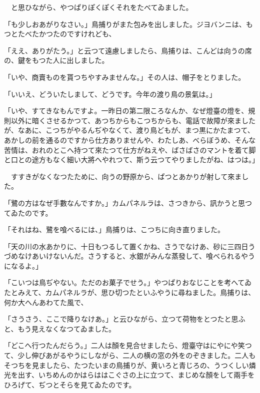 \documentclass[tate,paper=b6j,jafontsize=9pt]{jlreq}
\begin{document}
　と思ひながら、やつぱりぽくぽくそれをたべてゐました。

「も少しおあがりなさい。」鳥捕りがまた包みを出しました。ジヨバンニは、もつとたべたかつたのですけれども、

「ええ、ありがたう。」と云つて遠慮しましたら、鳥捕りは、こんどは向うの席の、鍵をもつた人に出しました。

「いや、商賣ものを貰つちやすみませんな。」その人は、帽子をとりました。

「いいえ、どういたしまして、どうです。今年の渡り鳥の景氣は。」

「いや、すてきなもんですよ。一昨日の第二限ころなんか、なぜ燈臺の燈を、規則以外に暗くさせるかつて、あつちからもこつちからも、電話で故障が來ましたが、なあに、こつちがやるんぢやなくて、渡り鳥どもが、まつ黒にかたまつて、あかしの前を通るのですから仕方ありませんや、わたしあ、べらぼうめ、そんな苦情は、おれのとこへ持つて來たつて仕方がねえや、ばさばさのマントを着て脚と口との途方もなく細い大將へやれつて、斯う云つてやりましたがね、はつは。」

　すすきがなくなつたために、向うの野原から、ぱつとあかりが射して來ました。

「鷺の方はなぜ手數なんですか。」カムパネルラは、さつきから、訊かうと思つてゐたのです。

「それはね、鷺を喰べるには、」鳥捕りは、こつちに向き直りました。

「天の川の水あかりに、十日もつるして置くかね、さうでなけあ、砂に三四日うづめなけあいけないんだ。さうすると、水銀がみんな蒸發して、喰べられるやうになるよ。」

「こいつは鳥ぢやない。ただのお菓子でせう。」やつぱりおなじことを考へてゐたとみえて、カムパネルラが、思ひ切つたといふやうに尋ねました。鳥捕りは、何か大へんあわてた風で、

「さうさう、ここで降りなけあ。」と云ひながら、立つて荷物をとつたと思ふと、もう見えなくなつてゐました。

「どこへ行つたんだらう。」二人は顏を見合せましたら、燈臺守はにやにや笑つて、少し伸びあがるやうにしながら、二人の横の窓の外をのぞきました。二人もそつちを見ましたら、たつたいまの鳥捕りが、黄いろと青じろの、うつくしい燐光を出す、いちめんのかはらははこぐさの上に立つて、まじめな顏をして兩手をひろげて、ぢつとそらを見てゐたのです。
\end{document}
